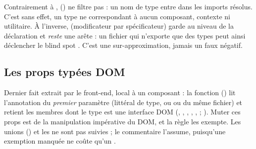 \begin{remarque}
Contrairement à ,  () ne filtre pas  : un nom de type entre dans les imports résolus. C'est sans effet, un type ne correspondant à aucun composant, contexte ni utilitaire. À l'inverse,  (modificateur par spécificateur) garde  au niveau de la déclaration et \emph{reste} une arête : un fichier qui n'exporte que des types peut ainsi déclencher le blind spot . C'est une sur-approximation, jamais un faux négatif.
\end{remarque}

\subsection{Les props typées DOM}

\begin{sloppypar}
Dernier fait extrait par le front-end, local à un composant : la fonction  () lit l'annotation du \emph{premier} paramètre (littéral de type, ou  ou  du même fichier) et retient les membres dont le type est une interface DOM (, , , , ,  ; ). Muter ces props est de la manipulation impérative du DOM, et la règle  les exempte. Les unions () et les  ne sont pas suivies ; le commentaire l'assume, puisqu'une exemption manquée ne coûte qu'un \Warning{}.
\end{sloppypar}

